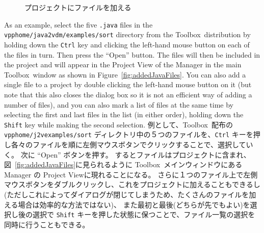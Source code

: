 \documentclass[\pformat,12pt]{jarticle}
\newcommand{\Toolbox}{Toolbox}
\newcommand{\vdmhome}{vpphome}
\newcommand{\cmd}{\tt }
\newcommand{\guicmd}[1]{{\sf #1}}
\begin{document}
\begin{figure}[tbh]
\begin{center}
\mbox{}
\caption{プロジェクトにファイルを加える\label{fig:addJavaFiles}}
\end{center}
\end{figure}

As an example, select the five {\tt .java} files in the 
{\tt \vdmhome/java2vdm/examples/sort} directory from the
\Toolbox\ distribution by holding down the {\cmd Ctrl} key and
clicking the left-hand mouse button on each of the 
files in turn. Then press the ``Open'' button. The files will then
be included in the project and will appear in the \guicmd{Project View}
of the \guicmd{Manager} in the main \Toolbox\ window as
shown in Figure~\ref{fig:addedJavaFiles}. You can also add a single
file to a project by double clicking the left-hand mouse button on it
(but note that this also closes the dialog box so it is not an
efficient way of adding a number of files), and you can also mark a
list of files at the same time by selecting the first and last files
in the list (in either order), holding down the {\cmd Shift} key while
making the second selection. 
例として、\Toolbox\ 配布の{\tt \vdmhome/j2vexamples/sort} ディレクトリ中の５つのファイルを、{\cmd Ctrl} キーを押し各々のファイルを順に左側マウスボタンでクリックすることで、選択していく。
次に ``Open'' ボタンを押す。
するとファイルはプロジェクトに含まれ、 図~\ref{fig:addedJavaFiles}に見られるように \Toolbox\ メインウィンドウにある \guicmd{Manager} の \guicmd{Project View}に現れることになる。
さらに１つのファイル上で左側マウスボタンをダブルクリックし、これをプロジェクトに加えることもできるし(ただしこれによってダイアログが閉じてしまうため、たくさんのファイルを加える場合は効率的な方法ではない)、 また最初と最後(どちらが先でもよい)を選択し後の選択で {\cmd Shift} キーを押した状態に保つことで、ファイル一覧の選択を同時に行うこともできる。
\end{document}
